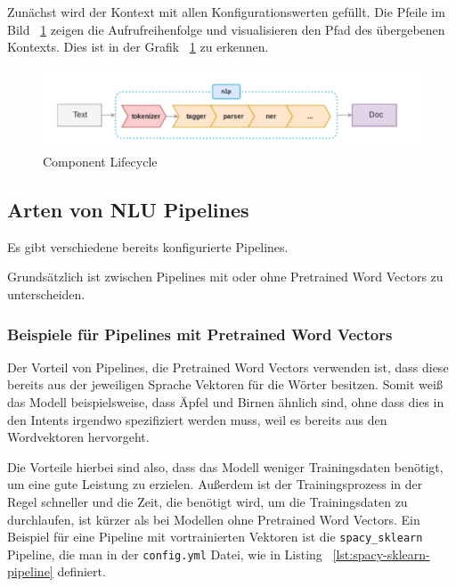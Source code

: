 Zunächst wird der Kontext mit allen Konfigurationswerten gefüllt.
Die Pfeile im Bild ~\ref{fig:pipeline_image} zeigen die Aufrufreihenfolge und visualisieren den Pfad des übergebenen Kontexts.\cite{componentLifecycle, componentLifecycleDoc}
Dies ist in der Grafik ~\ref{fig:pipeline_image} zu erkennen.

\begin{figure}[hbt!]
    \centering
    \includegraphics[scale=0.5]{pics/pipeline}
    \caption{Component Lifecycle~\cite{pipelineImage}}
    \label{fig:pipeline_image}
\end{figure}

\subsection{Arten von NLU Pipelines}\label{subsec:pipeline-types}

Es gibt verschiedene bereits konfigurierte Pipelines.\cite{howToChooseAPipeline}

Grundsätzlich ist zwischen Pipelines mit oder ohne Pretrained Word Vectors zu unterscheiden.

\subsubsection{Beispiele für Pipelines mit Pretrained Word Vectors}

Der Vorteil von Pipelines, die Pretrained Word Vectors verwenden ist, dass diese bereits aus der jeweiligen Sprache Vektoren für die Wörter besitzen.
Somit weiß das Modell beispielsweise, dass Äpfel und Birnen ähnlich sind, ohne dass dies in den Intents irgendwo spezifiziert werden muss, weil es bereits aus den Wordvektoren hervorgeht.\cite{differenceStackOverflow, rasaMasterclassPreConfiguredPipelines}

Die Vorteile hierbei sind also, dass das Modell weniger Trainingsdaten benötigt, um eine gute Leistung zu erzielen.
Außerdem ist der Trainingsprozess in der Regel schneller und die Zeit, die benötigt wird, um die Trainingsdaten zu durchlaufen, ist kürzer als bei Modellen ohne Pretrained Word Vectors.\cite{differenceStackOverflow, pretrainedVsSupervised, rasaMasterclassPreConfiguredPipelines}
Ein Beispiel für eine Pipeline mit vortrainierten Vektoren ist die \texttt{spacy\_sklearn} Pipeline, die man in der \texttt{config.yml} Datei, wie in Listing ~\ref{lst:spacy-sklearn-pipeline} definiert.

